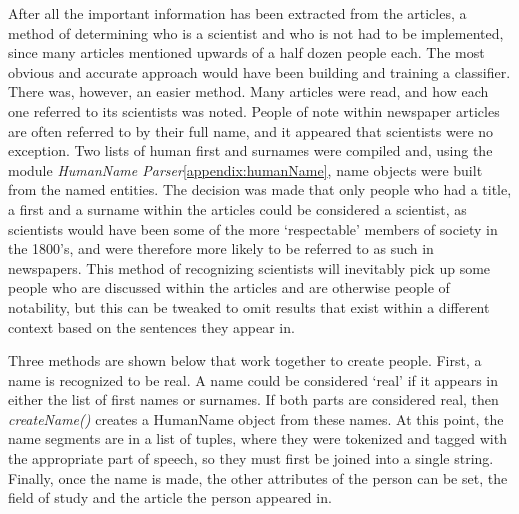 \documentclass[11pt,a4paper]{book}
\begin{document}
After all the important information has been extracted from the articles, a method of determining who is a scientist and who is not had to be implemented, since many articles mentioned upwards of a half dozen people each. The most obvious and accurate approach would have been building and training a classifier. There was, however, an easier method. Many articles were read, and how each one referred to its scientists was noted. People of note within newspaper articles are often referred to by their full name, and it appeared that scientists were no exception. Two lists of human first and surnames were compiled and, using the module \textit{HumanName Parser}\ref{appendix:humanName}, name objects were built from the named entities. The decision was made that only people who had a title, a first and a surname within the articles could be considered a scientist, as scientists would have been some of the more `respectable' members of society in the 1800's, and were therefore more likely to be referred to as such in newspapers. This method of recognizing scientists will inevitably pick up some people who are discussed within the articles and are otherwise people of notability, but this can be tweaked to omit results that exist within a different context based on the sentences they appear in. 

Three methods are shown below that work together to create people. First, a name is recognized to be real. A name could be considered `real' if it appears in either the list of first names or surnames. If both parts are considered real, then \textit{createName()} creates a HumanName object from these names. At this point, the name segments are in a list of tuples, where they were tokenized and tagged with the appropriate part of speech, so they must first be joined into a single string. Finally, once the name is made, the other attributes of the person can be set, the field of study and the article the person appeared in. 
\end{document}
